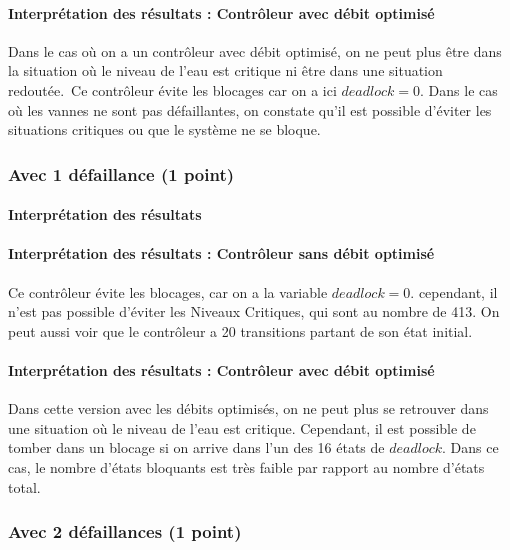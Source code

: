 \documentclass[a4paper]{book}
\begin{document}
\paragraph{Interprétation des résultats : Contrôleur avec débit optimisé}
Dans le cas où on a un contrôleur avec débit optimisé, on ne peut plus être dans la situation où le niveau de l'eau est critique ni être dans une situation redoutée.\
Ce contrôleur évite les blocages car on a ici $deadlock = 0$. Dans le cas où les vannes ne sont pas défaillantes, on constate qu’il est possible d’éviter les situations critiques ou que le système ne se bloque.



\subsubsection{Avec 1 défaillance (1 point)}


%
%
%
\paragraph{Interprétation des résultats}
\paragraph{Interprétation des résultats : Contrôleur sans débit optimisé}
Ce contrôleur évite les blocages, car on a la variable $deadlock = 0$. cependant, il n'est pas possible d'éviter les Niveaux Critiques, qui sont au nombre de 413.
On peut aussi voir que le contrôleur a 20 transitions partant de son état initial.


\paragraph{Interprétation des résultats : Contrôleur avec débit optimisé}
Dans cette version avec les débits optimisés, on ne peut plus se retrouver dans une situation où le niveau de l'eau est critique. Cependant, il est possible de tomber dans un blocage si on arrive dans l'un des 16 états de $deadlock$.
Dans ce cas, le nombre d'états bloquants est très faible par rapport au nombre d'états total.

\subsubsection{Avec 2 défaillances (1 point)}


%
%
%
\end{document}
